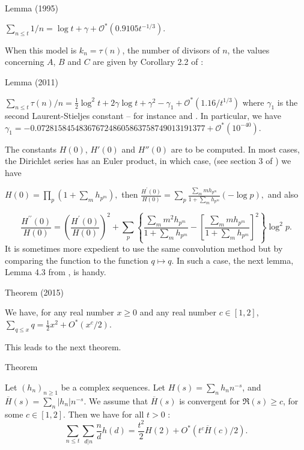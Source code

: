 \begin{thm}{Lemma (1995)}

$
\sum_{n\le t}1/n=\log t+\gamma+\mathcal{O}^*(0.9105 t^{-1/3}).
$
\end{thm}


When this model is $k_n=\tau(n)$, the number of divisors of $n$, the values concerning $A$,
$B$ and $C$ are given by Corollary 2.2 of
\cite{Berkane-Bordelles-Ramare*11}:


\begin{thm}{Lemma (2011)}

  $
    \sum_{n\le t}\tau(n)/n
    =\tfrac12\log^2t+2\gamma\log t
    +\gamma^2-\gamma_1+ \mathcal{O}^*(1.16/t^{1/3})
  $
  where $\gamma_1$ is the second Laurent-Stieljes constant --
  for instance \cite{Kreminski*03}
 and \cite{Coffey*06}. In particular, we have
  $
    \gamma_1=
    -0.0728158454836767248605863758749013191377
    + \mathcal{O}^*(10^{-40}).
  $
\end{thm}

The constants $H(0)$, $H'(0)$ and $H''(0)$ are to be computed. In most cases,
the Dirichlet series has an Euler product, in which case,
(see section 3 of
\cite{Ramare*95})
 we have

$
H(0)=\prod_p(1+\sum_mh_{p^m}),
$
then
$\displaystyle
\frac{H^{\prime}(0)}{H(0)}=
\sum_p
\frac{\sum_mmh_{p^m}}{1+\sum_mh_{p^m}}(-\log p),
$
and also

$$
\frac{H^{\prime\prime}(0)}{H(0)}=
\left(
\frac{H^{\prime}(0)}{H(0)}
\right)^2+
\sum_p
\left\{
\frac{\sum_mm^2h_{p^m}}{1+\sum_mh_{p^m}}
-\left[\frac{\sum_mmh_{p^m}}{1+\sum_mh_{p^m}}\right]^2
\right\}
\log^2p.
$$
It is sometimes more expedient to use the same convolution method but
by comparing the function to the function $q\mapsto q$. In such a
case, the next lemma, Lemma 4.3 from
\cite{Ramare*13d},
is handy.
\begin{thm}{Theorem (2015)}

  We have, for any real number $x\ge0$ and any real number $c\in[1,2]$,
  $\displaystyle \sum_{q\le x}q=\tfrac12 x^2+O^*(x^c/2)$.
\end{thm}

This leads to the next theorem.
\begin{thm}{Theorem}

  Let $(h_n)_{n\ge1}$  be a 
complex sequences. Let $H(s)=\sum_nh_nn^{-s}$, and
$\overline{H}(s)=\sum_n|h_n|n^{-s}$.
We assume that  $\overline{H}(s)$ is convergent for
$\Re(s)\ge c$, for some $c\in[1,2]$. 
Then we have for all $t>0$ :
$$
\sum_{n\le t}\sum_{d|n}\frac{n}{d}h(d)
=
\frac{t^2}{2}H(2)+O^*(t^c\overline{H}(c)/2).
$$
\end{thm}


